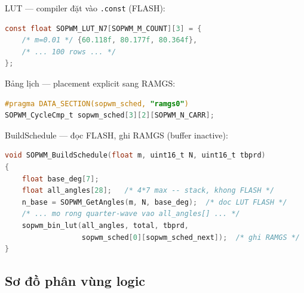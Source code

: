 LUT --- compiler đặt vào \texttt{.const} (FLASH):
\begin{lstlisting}[language=C]
const float SOPWM_LUT_N7[SOPWM_M_COUNT][3] = {
    /* m=0.01 */ {60.118f, 80.177f, 80.364f},
    /* ... 100 rows ... */
};
\end{lstlisting}

Bảng lịch --- placement explicit sang RAMGS:
\begin{lstlisting}[language=C]
#pragma DATA_SECTION(sopwm_sched, "ramgs0")
SOPWM_CycleCmp_t sopwm_sched[3][2][SOPWM_N_CARR];
\end{lstlisting}

BuildSchedule --- đọc FLASH, ghi RAMGS (buffer inactive):
\begin{lstlisting}[language=C]
void SOPWM_BuildSchedule(float m, uint16_t N, uint16_t tbprd)
{
    float base_deg[7];
    float all_angles[28];   /* 4*7 max -- stack, khong FLASH */
    n_base = SOPWM_GetAngles(m, N, base_deg);  /* doc LUT FLASH */
    /* ... mo rong quarter-wave vao all_angles[] ... */
    sopwm_bin_lut(all_angles, total, tbprd,
                  sopwm_sched[0][sopwm_sched_next]);  /* ghi RAMGS */
}
\end{lstlisting}

\subsection{Sơ đồ phân vùng logic}

